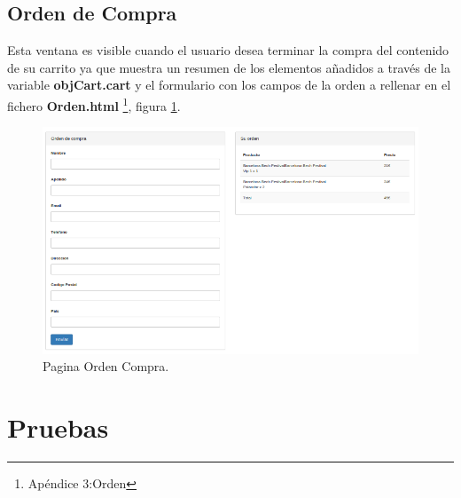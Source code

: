 \subsection*{Orden de Compra}
Esta ventana es visible cuando el usuario desea terminar la compra del contenido de su carrito  ya que muestra un resumen de los elementos añadidos a través de la variable \textbf{objCart.cart} y el formulario con los campos de la orden a rellenar en el fichero \textbf{Orden.html} \footnote{Apéndice 3:Orden}, figura  \ref{fig:Page_OrdenCompra}.
\begin{figure}[!h]
\begin{center}
   \includegraphics[width=0.5\linewidth]{Figures/CheckOut_CarShop}
	\decoRule
	\caption[ Orden Compra]{Pagina Orden Compra.}
\label{fig:Page_OrdenCompra}
\end{center}
\end{figure}
\section{Pruebas}